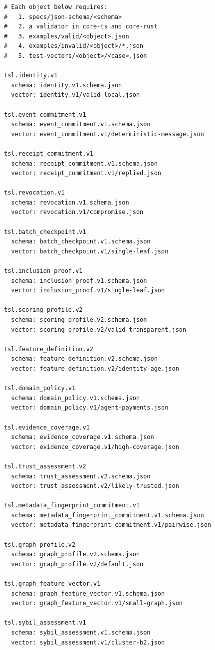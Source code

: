 \documentclass[11pt]{article}
\begin{document}
\begin{lstlisting}[style=tslcode]
# Each object below requires:
#   1. specs/json-schema/<schema>
#   2. a validator in core-ts and core-rust
#   3. examples/valid/<object>.json
#   4. examples/invalid/<object>/*.json
#   5. test-vectors/<object>/<case>.json

tsl.identity.v1
  schema: identity.v1.schema.json
  vector: identity.v1/valid-local.json

tsl.event_commitment.v1
  schema: event_commitment.v1.schema.json
  vector: event_commitment.v1/deterministic-message.json

tsl.receipt_commitment.v1
  schema: receipt_commitment.v1.schema.json
  vector: receipt_commitment.v1/replied.json

tsl.revocation.v1
  schema: revocation.v1.schema.json
  vector: revocation.v1/compromise.json

tsl.batch_checkpoint.v1
  schema: batch_checkpoint.v1.schema.json
  vector: batch_checkpoint.v1/single-leaf.json

tsl.inclusion_proof.v1
  schema: inclusion_proof.v1.schema.json
  vector: inclusion_proof.v1/single-leaf.json

tsl.scoring_profile.v2
  schema: scoring_profile.v2.schema.json
  vector: scoring_profile.v2/valid-transparent.json

tsl.feature_definition.v2
  schema: feature_definition.v2.schema.json
  vector: feature_definition.v2/identity-age.json

tsl.domain_policy.v1
  schema: domain_policy.v1.schema.json
  vector: domain_policy.v1/agent-payments.json

tsl.evidence_coverage.v1
  schema: evidence_coverage.v1.schema.json
  vector: evidence_coverage.v1/high-coverage.json

tsl.trust_assessment.v2
  schema: trust_assessment.v2.schema.json
  vector: trust_assessment.v2/likely-trusted.json

tsl.metadata_fingerprint_commitment.v1
  schema: metadata_fingerprint_commitment.v1.schema.json
  vector: metadata_fingerprint_commitment.v1/pairwise.json

tsl.graph_profile.v2
  schema: graph_profile.v2.schema.json
  vector: graph_profile.v2/default.json

tsl.graph_feature_vector.v1
  schema: graph_feature_vector.v1.schema.json
  vector: graph_feature_vector.v1/small-graph.json

tsl.sybil_assessment.v1
  schema: sybil_assessment.v1.schema.json
  vector: sybil_assessment.v1/cluster-b2.json


\end{lstlisting}
\end{document}
